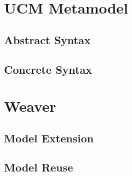 \section{UCM Metamodel}

\subsection{Abstract Syntax}

\subsection{Concrete Syntax}

\section{Weaver}

\subsection{Model Extension}

\subsection{Model Reuse}
